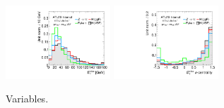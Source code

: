 \begin{figure}[tp]
  \includegraphics[width=0.35\textwidth]{figures/overlaid/vbf/met-pt-hi}
  \includegraphics[width=0.35\textwidth]{figures/overlaid/vbf/met-phi-centrality}
  \caption{Variables.}
  \label{fig:strategy-overlaid-vbf-taus}
\end{figure}
